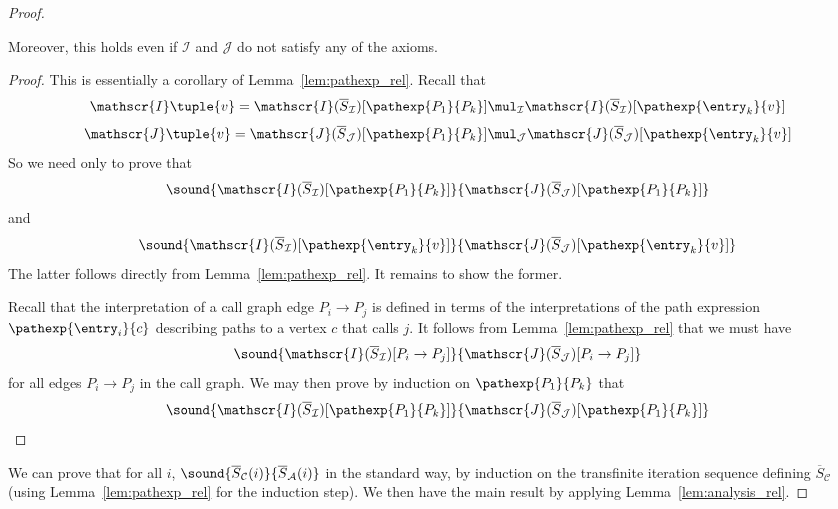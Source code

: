 \begin{proof}
\begin{lemma}
     Moreover, this holds even if $\mathcal{I}$ and $\mathcal{J}$ do not
     satisfy any of the \QPKA{} axioms.
   \end{lemma}
   \begin{proof}
     This is essentially a corollary of Lemma~\ref{lem:pathexp_rel}.  Recall
     that
     \[ \mathscr{I}\tuple{v} = \mathscr{I}(\overline{S}_{\mathcal{I}})[\pathexp{P_1}{P_k}] \mul_\mathcal{I} \mathscr{I}(\overline{S}_{\mathcal{I}})[\pathexp{\entry_k}{v}] \]
     \[ \mathscr{J}\tuple{v} = \mathscr{J}(\overline{S}_{\mathcal{J}})[\pathexp{P_1}{P_k}] \mul_\mathcal{J} \mathscr{J}(\overline{S}_{\mathcal{J}})[\pathexp{\entry_k}{v}] \]
   So we need only to prove that
   \[ \sound{\mathscr{I}(\overline{S}_{\mathcal{I}})[\pathexp{P_1}{P_k}]}{\mathscr{J}(\overline{S}_{\mathcal{J}})[\pathexp{P_1}{P_k}]} \]
   and 
   \[ \sound{\mathscr{I}(\overline{S}_{\mathcal{I}})[\pathexp{\entry_k}{v}]}{\mathscr{J}(\overline{S}_{\mathcal{J}})[\pathexp{\entry_k}{v}]} \]
   The latter follows directly from Lemma~\ref{lem:pathexp_rel}.  It remains
   to show the former.

   Recall that the interpretation of a call graph edge $P_i \rightarrow P_j$
   is defined in terms of the interpretations of the path expression
   $\pathexp{\entry_i}{c}$ describing paths to a vertex $c$ that calls $j$.
   It follows from Lemma~\ref{lem:pathexp_rel} that we must have
   \[ \sound{\mathscr{I}(\overline{S}_{\mathcal{I}})[P_i \rightarrow P_j]}{\mathscr{J}(\overline{S}_{\mathcal{J}})[P_i \rightarrow P_j]} \]
   for all edges $P_i \rightarrow P_j$ in the call graph.  We may then prove by
   induction on $\pathexp{P_1}{P_k}$ that
   \[ \sound{\mathscr{I}(\overline{S}_{\mathcal{I}})[\pathexp{P_1}{P_k}]}{\mathscr{J}(\overline{S}_{\mathcal{J}})[\pathexp{P_1}{P_k}]} \]
   \end{proof}
   We can prove that for all $i$,
   $\sound{\overline{S}_{\mathcal{C}}(i)}{\overline{S}_\mathcal{A}(i)}$ in the
   standard way, by induction on the transfinite iteration sequence defining
   $\overline{S}_{\mathcal{C}}$ (using Lemma~\ref{lem:pathexp_rel} for the
   induction step).  We then have the main result by applying
   Lemma~\ref{lem:analysis_rel}.
 \end{proof}










   






































